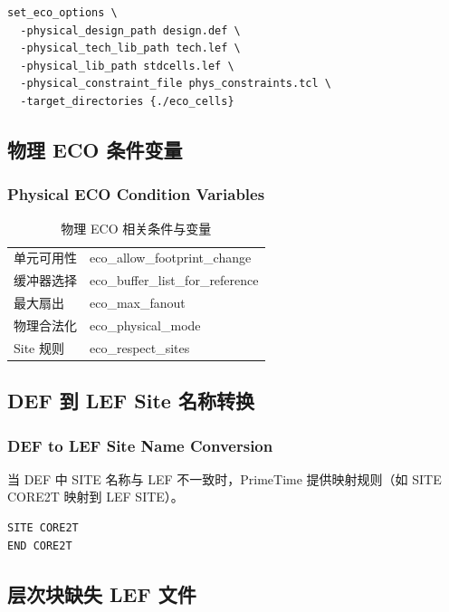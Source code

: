 \begin{lstlisting}
set_eco_options \
  -physical_design_path design.def \
  -physical_tech_lib_path tech.lef \
  -physical_lib_path stdcells.lef \
  -physical_constraint_file phys_constraints.tcl \
  -target_directories {./eco_cells}
\end{lstlisting}

\subsection{物理 ECO 条件变量}
\subsubsection*{Physical ECO Condition Variables}

\begin{table}[htbp]
\centering
\caption{物理 ECO 相关条件与变量}
\small
\begin{tabular}{|L{0.4\textwidth}|L{0.5\textwidth}|}
\hline
{} &  \\
\hline
单元可用性 & eco\_allow\_footprint\_change \\
缓冲器选择 & eco\_buffer\_list\_for\_reference \\
最大扇出 & eco\_max\_fanout \\
物理合法化 & eco\_physical\_mode \\
Site 规则 & eco\_respect\_sites \\
\hline
\end{tabular}
\end{table}

\subsection{DEF 到 LEF Site 名称转换}
\subsubsection*{DEF to LEF Site Name Conversion}

当 DEF 中 SITE 名称与 LEF 不一致时，PrimeTime 提供映射规则（如 SITE CORE2T 映射到 LEF SITE）。

\begin{lstlisting}
SITE CORE2T
END CORE2T
\end{lstlisting}

\subsection{层次块缺失 LEF 文件}
